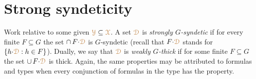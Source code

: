\begin{comment}

\begin{corollary}
  Let $G=\Aut(\U/A)$.
  Let $\mrX=p(\U^{\mr x})$ where $p({\mr x})$ is a complete $\GDelta(A)$-type.
  Then for every $\BDelta(\grZ)$-definable set $\mrD$ that intersects $\mrX$ the following are equivalent
  \begin{itemize}
    \item [1.]  $\mrC\subseteq\mrD$ for some $\mrC\in\acl^\eq\!A$ that intersects $\mrX$
    \item [2.]  $\mrD$ is $G$-syndetic.
  \end{itemize}
\end{corollary}

\begin{proof}
  \ssf1$\IMP$\ssf2.
  Pick any ${\mr a}\in\mrC\cap\mrX$.
  We can assume that $\mrC=\epsilon(\U^{\mr x}\,;{\mr a})$ is an equivalence class of some finite equivalence relation $\epsilon({\mr x}\,;{\mr y})\in L(A)$ 
  As $G$ acts transitively on $\mrX$ the orbit of $\mrC$ coves $\mrX$.
  Therefore $\mrC\subseteq\mrD$, and a fortiori $\mrD$, is $G$-syndetic.

  \ssf2$\IMP$\ssf1.
  Let $Q_G$ be as in Lemma~\ref{lem_trans_action}.
  Pick any $q({\mr x})\in Q_G$.
  By syndeticity $q({\mr x})\proves{\mr x}\in g{\cdot}\mrD$ for some $g\in G$.
  Then $g^{-1}\!\cdot q({\mr x})\proves{\mr x}\in \mrD$.
  Pick any ${\mr a}\models g^{-1}\!\cdot q({\mr x})$.
  As $g^{-1}\!\cdot q({\mr x})\in Q_G$, by the second claim in the lemma and compactness,  $\epsilon(\U^{\mr x}\,;{\mr a})\subseteq\mrD$ for some finite equivalence relation $\epsilon({\mr x}\,;{\mr y})\in\GDelta(A)$.
\end{proof}
\end{comment}

\section{Strong syndeticity}\label{strong_syndeticity}


Work relative to some given ${\color{brown}\EuScript Y}\subseteq{\color{brown}\EuScript X}$.
A set ${\color{brown}\EuScript D}$ is \emph{strongly $G$-syndetic\/} if for every finite $F\subseteq G$ the set $\cap\,F{\cdot}{\color{brown}\EuScript D}$ is $G$-syndetic (recall that $F{\cdot}{\color{brown}\EuScript D}$ stands for $\{h{\cdot}{\color{brown}\EuScript D} : h\in F\}$).
Dually, we say that ${\color{brown}\EuScript D}$ is \emph{weakly $G$-thick\/} if for some finite $F\subseteq G$ the set $\cup\,F{\cdot}{\color{brown}\EuScript D}$ is thick.
Again, the same properties may be attributed to formulas and types when every conjunction of formulas in the type has the property.

